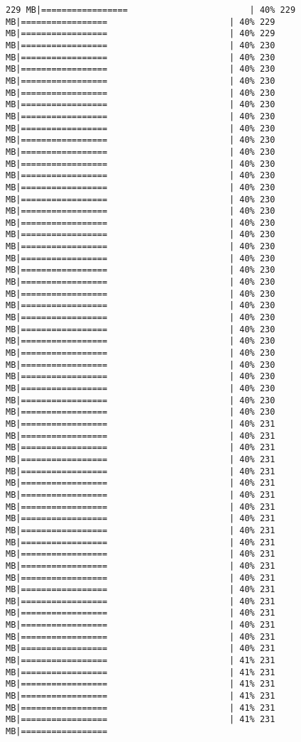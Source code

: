 \documentclass[
]{article}
\begin{document}
\begin{verbatim}
229 MB|=================                        | 40% 229 MB|=================                        | 40% 229 MB|=================                        | 40% 229 MB|=================                        | 40% 230 MB|=================                        | 40% 230 MB|=================                        | 40% 230 MB|=================                        | 40% 230 MB|=================                        | 40% 230 MB|=================                        | 40% 230 MB|=================                        | 40% 230 MB|=================                        | 40% 230 MB|=================                        | 40% 230 MB|=================                        | 40% 230 MB|=================                        | 40% 230 MB|=================                        | 40% 230 MB|=================                        | 40% 230 MB|=================                        | 40% 230 MB|=================                        | 40% 230 MB|=================                        | 40% 230 MB|=================                        | 40% 230 MB|=================                        | 40% 230 MB|=================                        | 40% 230 MB|=================                        | 40% 230 MB|=================                        | 40% 230 MB|=================                        | 40% 230 MB|=================                        | 40% 230 MB|=================                        | 40% 230 MB|=================                        | 40% 230 MB|=================                        | 40% 230 MB|=================                        | 40% 230 MB|=================                        | 40% 230 MB|=================                        | 40% 230 MB|=================                        | 40% 230 MB|=================                        | 40% 230 MB|=================                        | 40% 230 MB|=================                        | 40% 231 MB|=================                        | 40% 231 MB|=================                        | 40% 231 MB|=================                        | 40% 231 MB|=================                        | 40% 231 MB|=================                        | 40% 231 MB|=================                        | 40% 231 MB|=================                        | 40% 231 MB|=================                        | 40% 231 MB|=================                        | 40% 231 MB|=================                        | 40% 231 MB|=================                        | 40% 231 MB|=================                        | 40% 231 MB|=================                        | 40% 231 MB|=================                        | 40% 231 MB|=================                        | 40% 231 MB|=================                        | 40% 231 MB|=================                        | 40% 231 MB|=================                        | 40% 231 MB|=================                        | 40% 231 MB|=================                        | 41% 231 MB|=================                        | 41% 231 MB|=================                        | 41% 231 MB|=================                        | 41% 231 MB|=================                        | 41% 231 MB|=================                        | 41% 231 MB|================= 
\end{verbatim}
\end{document}
